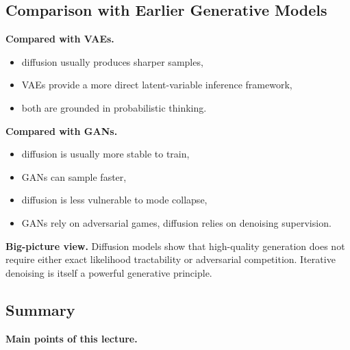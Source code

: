 \subsection{Comparison with Earlier Generative Models}

\textbf{Compared with VAEs.}
\begin{itemize}
    \item diffusion usually produces sharper samples,
    \item VAEs provide a more direct latent-variable inference framework,
    \item both are grounded in probabilistic thinking.
\end{itemize}

\medskip

\noindent
\textbf{Compared with GANs.}
\begin{itemize}
    \item diffusion is usually more stable to train,
    \item GANs can sample faster,
    \item diffusion is less vulnerable to mode collapse,
    \item GANs rely on adversarial games, diffusion relies on denoising supervision.
\end{itemize}

\medskip

\noindent
\textbf{Big-picture view.}
Diffusion models show that high-quality generation does not require either exact likelihood tractability or adversarial competition. Iterative denoising is itself a powerful generative principle.

\subsection{Summary}

\textbf{Main points of this lecture.}

